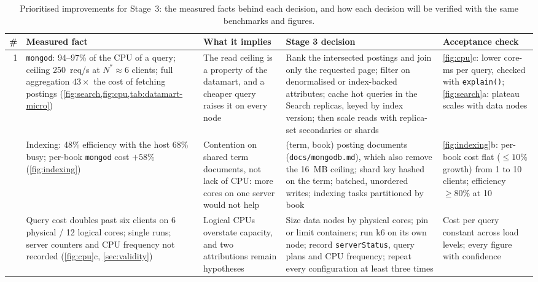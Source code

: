 \documentclass[10pt,a4paper]{article}
\newcommand{\code}[1]{\texttt{#1}}
\begin{document}
\begin{table}[htbp]
  \centering
  \footnotesize
  \caption{Prioritised improvements for Stage~3: the measured facts behind each
  decision, and how each decision will be verified with the same benchmarks and
  figures.}
  \label{tab:evidence-stage3}
  \begin{tabularx}{\textwidth}{@{}r>{\raggedright\arraybackslash}p{3.4cm}>{\raggedright\arraybackslash}p{2.9cm}>{\raggedright\arraybackslash}X>{\raggedright\arraybackslash}p{3.1cm}@{}}
    \toprule
    \# & Measured fact & What it implies & Stage 3 decision & Acceptance check \\
    \midrule
    1 & \code{mongod}: 94--97\% of the CPU of a query; ceiling 250~req/s at
      $N^{*} \approx 6$ clients; full aggregation $43\times$ the cost of
      fetching postings (\cref{fig:search,fig:cpu,tab:datamart-micro}) &
      The read ceiling is a property of the datamart, and a cheaper query raises
      it on every node &
      Rank the intersected postings and join only the requested page; filter on
      denormalised or index-backed attributes; cache hot queries in the Search
      replicas, keyed by index version; then scale reads with replica-set
      secondaries or shards &
      \cref{fig:cpu}c: lower core-ms per query, checked with \code{explain()};
      \cref{fig:search}a: plateau scales with data nodes \\
    \addlinespace
    2 & Indexing: 48\% efficiency with the host 68\% busy; per-book
      \code{mongod} cost $+58\%$ (\cref{fig:indexing}) &
      Contention on shared term documents, not lack of CPU: more cores on one
      server would not help &
      (term, book) posting documents (\code{docs/mongodb.md}), which also remove
      the 16~MB ceiling; shard
      key hashed on the term; batched, unordered writes; indexing tasks
      partitioned by book &
      \cref{fig:indexing}b: per-book cost flat ($\le 10\%$ growth) from 1 to 10
      clients; efficiency $\ge 80\%$ at 10 \\
    \addlinespace
    3 & Query cost doubles past six clients on 6 physical / 12 logical cores;
      single runs; server counters and CPU frequency not recorded
      (\cref{fig:cpu}c, \cref{sec:validity}) &
      Logical CPUs overstate capacity, and two attributions remain hypotheses &
      Size data nodes by physical cores; pin or limit containers; run k6 on its
      own node; record \code{serverStatus}, query plans and CPU frequency;
      repeat every configuration at least three times &
      Cost per query constant across load levels; every figure with confidence

\end{tabularx}
\end{table}
\end{document}
